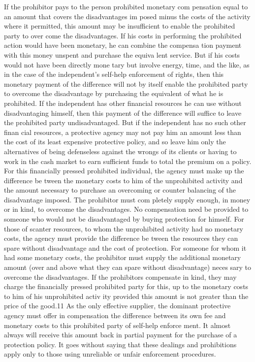 \documentclass[11pt,openany]{book}
\begin{document}
If the prohibitor pays to the person prohibited monetary com pensation equal to an amount that covers the disadvantages im posed minus the costs of the activity where it permitted, this amount may be insufficient to enable the prohibited party to over come the disadvantages. If his costs in performing the prohibited action would have been monetary, he can combine the compensa tion payment with this money unspent and purchase the equiva lent service. But if his costs would not have been directly mone tary but involve energy, time, and the like, as in the case of the independent's self-help enforcement of rights, then this monetary payment of the difference will not by itself enable the prohibited party to overcome the disadvantage by purchasing the equivalent of what he is prohibited. If the independent has other financial resources he can use without disadvantaging himself, then this payment of the difference will suffice to leave the prohibited party undisadvantaged. But if the independent has no such other finan cial resources, a protective agency may not pay him an amount less than the cost of its least expensive protective policy, and so leave him only the alternatives of being defenseless against the wrongs of its clients or having to work in the cash market to earn sufficient funds to total the premium on a policy. For this financially pressed prohibited individual, the agency must make up the difference be tween the monetary costs to him of the unprohibited activity and the amount necessary to purchase an overcoming or counter balancing of the disadvantage imposed. The prohibitor must com pletely supply enough, in money or in kind, to overcome the disadvantages. No compensation need be provided to someone who would not be disadvantaged by buying protection for himself. For those of scanter resources, to whom the unprohibited activity had no monetary costs, the agency must provide the difference be tween the resources they can spare without disadvantage and the cost of protection. For someone for whom it had some monetary costs, the prohibitor must supply the additional monetary amount (over and above what they can spare without disadvantage) neces sary to overcome the disadvantages. If the prohibitors compensate in kind, they may charge the financially pressed prohibited party for this, up to the monetary costs to him of his unprohibited activ ity provided this amount is not greater than the price of the good.11 As the only effective supplier, the dominant protective agency must offer in compensation the difference between its own fee and monetary costs to this prohibited party of self-help enforce ment. It almost always will receive this amount back in partial payment for the purchase of a protection policy. It goes without saying that these dealings and prohibitions apply only to those using unreliable or unfair enforcement procedures. 
\end{document}
